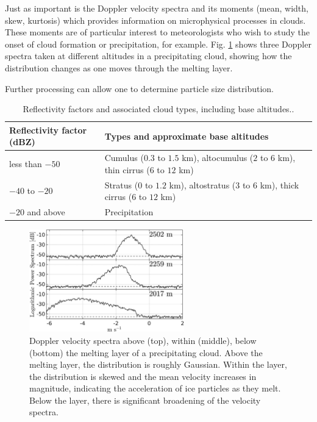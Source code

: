 \documentclass{article}
\begin{document}
Just as important is the Doppler velocity spectra and its moments (mean, width, skew, kurtosis) which provides information on microphysical processes in clouds. These moments are of particular interest to meteorologists who wish to study the onset of cloud formation or precipitation, for example.
Fig. \ref{fig:ExampleDopplerSpectra} shows three Doppler spectra taken at different altitudes in a precipitating cloud, showing how the distribution changes as one moves through the melting layer.

Further processing can allow one to determine particle size distribution.\supercite{DopplerMoments}

\begin{table}
	\centering
	\begin{tabular}{l|l}
		Reflectivity factor (dBZ) & Types and approximate base altitudes \\
		\midrule
		less than \(-50\)         & Cumulus (\(0.3\) to \(1.5\) \si{\kilo\metre}), altocumulus (\(2\) to \(6\) \si{\kilo\metre}), thin cirrus (\(6\) to \(12\) \si{\kilo\metre}) \\
		\(-40\) to \(-20\)        & Stratus (\(0\) to \(1.2\) \si{\kilo\metre}), altostratus (\(3\) to \(6\) \si{\kilo\metre}), thick cirrus (\(6\) to \(12\) \si{\kilo\metre})  \\
		\(-20\) and above         & Precipitation
	\end{tabular}
	\caption{Reflectivity factors and associated cloud types,\supercite{KolliasFrontier} including base altitudes.\supercite{CloudTypes}.}
	\label{tbl:dBZInterpretation}
\end{table}

\begin{figure}[h!]
	\centering
	\includegraphics[width=0.6\textwidth]{doppler-spectra}
	\caption{Doppler velocity spectra above (top), within (middle), below (bottom) the melting layer of a precipitating cloud.\supercite{RPGPaper} Above the melting layer, the distribution is roughly Gaussian. Within the layer, the distribution is skewed and the mean velocity increases in magnitude, indicating the acceleration of ice particles as they melt. Below the layer, there is significant broadening of the velocity spectra.}
	\label{fig:ExampleDopplerSpectra}
\end{figure}
\end{document}
